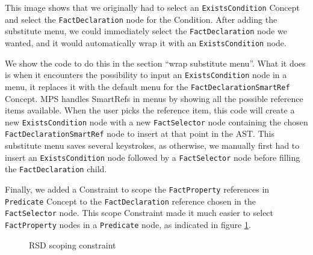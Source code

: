 This image shows that we originally had to select an \texttt{ExistsCondition} Concept and select the \texttt{FactDeclaration} node for the Condition.
After adding the substitute menu, we could immediately select the \texttt{FactDeclaration} node we wanted, and it would automatically wrap it with an \texttt{ExistsCondition} node.

We show the code to do this in the section ``wrap substitute menu''.
What it does is when it encounters the possibility to input an \texttt{ExistsCondition} node in a menu, it replaces it with the default menu for the \texttt{FactDeclarationSmartRef} Concept.
MPS handles SmartRefs in menus by showing all the possible reference items available.
When the user picks the reference item, this code will create a new \texttt{ExistsCondition} node with a new \texttt{FactSelector} node containing the chosen \texttt{FactDeclarationSmartRef} node to insert at that point in the AST.
This substitute menu saves several keystrokes, as otherwise, we manually first had to insert an \texttt{ExistsCondition} node followed by a \texttt{FactSelector} node before filling the \texttt{FactDeclaration} child.

Finally, we added a Constraint to scope the \texttt{FactProperty} references in \texttt{Predicate} Concept to the \texttt{FactDeclaration} reference chosen in the \texttt{FactSelector} node.
This scope Constraint made it much easier to select \texttt{FactProperty} nodes in a \texttt{Predicate} node, as indicated in figure \ref{fig:RSDConstraint}.

\begin{figure}
    \centering
    \caption{RSD scoping constraint}
    \label{fig:RSDConstraint}
\end{figure}

